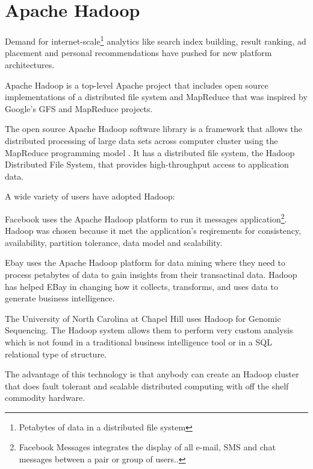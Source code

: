 \documentclass[12pt,a4paper]{report}
\begin{document}
\section{Apache Hadoop}


Demand for internet-scale\footnote{Petabytes of data in a distributed file system} analytics like search index building, result ranking, ad placement and personal recommendations have pushed for new platform architectures. 


Apache Hadoop\cite{website:apache-hadoop} is a top-level Apache project that includes open source implementations of a distributed file system\cite{website:apache-hdfs} and MapReduce that was inspired by Google's GFS\cite{ghemawat2003google} and MapReduce\cite{dean2008mapreduce} projects.

The open source Apache Hadoop software library is a framework that 
allows the distributed processing of large data sets across computer cluster using the MapReduce programming model \cite{website:apache-hadoop}. It has a distributed file system, the Hadoop Distributed File System, that provides 
high-throughput access to application data.

A wide variety of users have adopted Hadoop:

Facebook uses the Apache Hadoop platform to run it messages application\footnote {Facebook Messages 
integrates the display of all e-mail, SMS and chat messages between a pair or group of users.\cite{borthakur2011apache}.}. Hadoop was chosen because it met the application's reqirements for consistency, availability, partition tolerance, data model and scalability\cite{borthakur2011apache}.

Ebay uses the Apache Hadoop platform for data mining where they need to process petabytes of data to gain insights
from their transactinal data. Hadoop has helped EBay in changing how it collects, transforms, and uses data to generate business intelligence\cite {blog:ebay}.

The University of North Carolina at Chapel Hill uses Hadoop for Genomic Sequencing. 
The Hadoop system allows them to perform very custom analysis which is not found in a traditional business intelligence tool or in a SQL relational type of structure\cite{website:intel-hadoop}.


The advantage of this technology is that anybody can create an Hadoop cluster that
does fault tolerant and scalable distributed computing with off the shelf commodity hardware.
\end{document}
